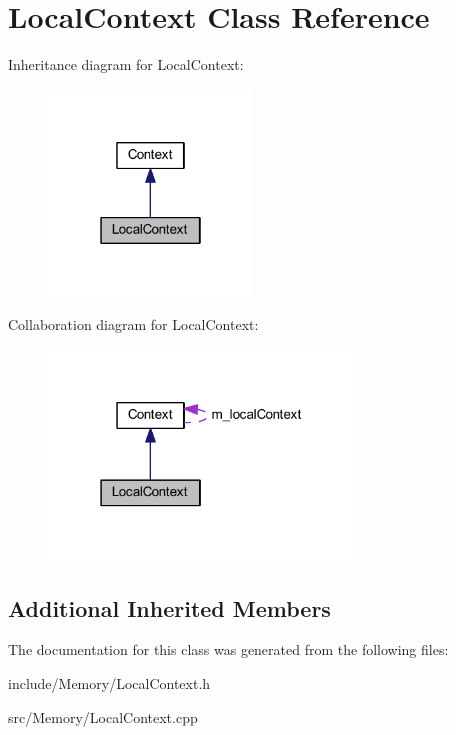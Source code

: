 \hypertarget{class_local_context}{\section{Local\-Context Class Reference}
\label{class_local_context}
}


Inheritance diagram for Local\-Context\-:\nopagebreak
\begin{figure}[H]
\begin{center}
\leavevmode
\includegraphics[width=154pt]{class_local_context__inherit__graph}
\end{center}
\end{figure}


Collaboration diagram for Local\-Context\-:\nopagebreak
\begin{figure}[H]
\begin{center}
\leavevmode
\includegraphics[width=231pt]{class_local_context__coll__graph}
\end{center}
\end{figure}
\subsection*{Additional Inherited Members}


The documentation for this class was generated from the following files\-:\begin{DoxyCompactItemize}
\item 
include/\-Memory/Local\-Context.\-h\item 
src/\-Memory/Local\-Context.\-cpp\end{DoxyCompactItemize}
